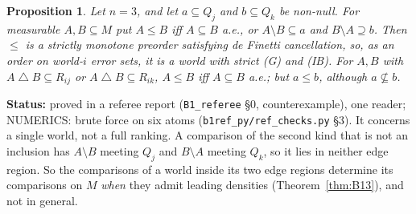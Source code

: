 \documentclass[11pt]{article}
\newtheorem{proposition}[theorem]{Proposition}
\theoremstyle{definition}
\theoremstyle{remark}
\newcommand{\sd}{\mathbin{\triangle}}
\newcommand{\src}[1]{\texttt{#1}}
\newcommand{\status}[1]{\par\smallskip\noindent\textbf{Status:} #1\par\smallskip}
\begin{document}
\begin{proposition}\label{prop:B1cex}
Let $n=3$, and let $a\subseteq Q_j$ and $b\subseteq Q_k$ be non-null. For measurable $A,B\subseteq M$ put $A\le B$ iff $A\subseteq B$ a.e., or $A\setminus B\subseteq a$ and $B\setminus A\supseteq b$. Then $\le$ is a strictly monotone preorder satisfying de Finetti cancellation, so, as an order on world-$i$ error sets, it is a world with strict (G) and (IB). For $A,B$ with $A\sd B\subseteq R_{ij}$ or $A\sd B\subseteq R_{ik}$, $A\le B$ iff $A\subseteq B$ a.e.; but $a\le b$, although $a\not\subseteq b$.
\end{proposition}
\status{proved in a referee report (\src{B1\_referee} \S0, counterexample), one reader; NUMERICS: brute force on six atoms (\src{b1ref\_py/ref\_checks.py} \S3). It concerns a single world, not a full ranking. A comparison of the second kind that is not an inclusion has $A\setminus B$ meeting $Q_j$ and $B\setminus A$ meeting $Q_k$, so it lies in neither edge region. So the comparisons of a world inside its two edge regions determine its comparisons on $M$ \emph{when} they admit leading densities (Theorem~\ref{thm:B13}), and not in general.}
\end{document}
